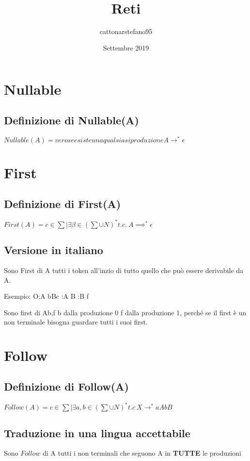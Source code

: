 \documentclass{article}
\title{Reti}
\author{cattonarstefano95 }
\date{Settembre 2019}
\begin{document}
\maketitle
    \section{Nullable}
        \subsection*{Definizione di Nullable(A)}
        $Nullable(A)= vero se esiste una qualsiasi produzione A \to^*\epsilon$
    \section{First}
        \subsection*{Definizione di First(A)}
            $First(A)=c \in \sum | \exists \beta \in{(\sum \cup N)^*} t.c.\: A \implies^* \epsilon$ 
        \subsection*{Versione in italiano}
            Sono First di A tutti i token all'inzio di tutto quello che può essere derivabile da A.
            
            Esempio:\newline
            O:A \to bBc :A \to B :B \to f \newline
            
            Sono first di A{b,f}\newline
            b dalla produzione 0\newline
            f dalla produzione 1, perché se il first è un non terminale bisogna guardare tutti i suoi first.
    \section{Follow}
        \subsection*{Definizione di Follow(A)}
            $Follow(A)= c \in \sum | \exists{a,b \in (\sum \cup N)^*}t.c \: X\to^*aAbB $
        \subsection*{Traduzione in una lingua accettabile}
            Sono $Follow$ di A tutti i non terminali che seguono A in \textbf{TUTTE} le produzioni
            
\end{document}
